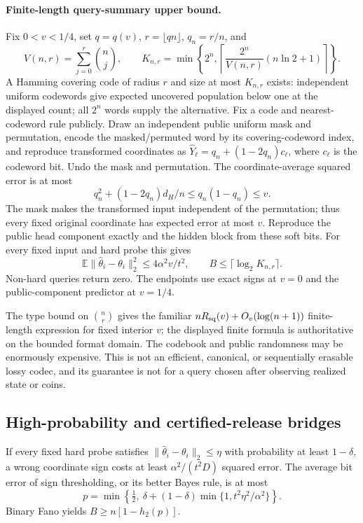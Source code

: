 \paragraph{Finite-length query-summary upper bound.}
Fix $0<v<1/4$, set $q=q(v)$, $r=\lfloor qn\rfloor$, $q_n=r/n$, and
\[
 V(n,r)=\sum_{j=0}^{r}\binom nj,\qquad
 K_{n,r}=\min\left\{2^n,
 \left\lceil\frac{2^n}{V(n,r)}(n\ln2+1)\right\rceil\right\}.
\]
A Hamming covering code of radius $r$ and size at most $K_{n,r}$ exists:
independent uniform codewords give expected uncovered population below
one at the displayed count; all $2^n$ words supply the alternative.
Fix a code and nearest-codeword rule publicly.  Draw an independent public
uniform mask and permutation, encode the masked/permuted word by its
covering-codeword index, and reproduce transformed coordinates as
$\widehat Y_\ell=q_n+(1-2q_n)c_\ell$, where $c_\ell$ is the codeword bit.
Undo the mask and permutation.
The coordinate-average squared error is at most
\[
 q_n^2+(1-2q_n)d_H/n\le q_n(1-q_n)\le v.
\]
The mask makes the transformed input independent of the permutation; thus
every fixed original coordinate has expected error at most $v$.  Reproduce
the public head component exactly and the hidden block from these soft
bits.  For every fixed input and hard probe this gives
\[
 \mathbb E\|\widehat\theta_i-\theta_i\|_2^2
 \le4\alpha^2v/t^2,\qquad B\le\lceil\log_2K_{n,r}\rceil.
\]
Non-hard queries return zero.  The endpoints use exact signs at $v=0$ and
the public-component predictor at $v=1/4$.

The type bound on $\binom nr$ gives the familiar
$nR_{\rm sq}(v)+O_v(\log(n+1))$ finite-length expression for fixed interior
$v$; the displayed finite formula is authoritative on the bounded format
domain.  The codebook and public randomness may be enormously expensive.
This is not an efficient, canonical, or sequentially erasable lossy codec,
and its guarantee is not for a query chosen after observing realized
state or coins.

\subsection{High-probability and certified-release bridges}
If every fixed hard probe satisfies $\|\widehat\theta_i-\theta_i\|_2\le\eta$
with probability at least $1-\delta$, a wrong coordinate sign costs at
least $\alpha^2/(t^2D)$ squared error.  The average bit error of sign
thresholding, or its better Bayes rule, is at most
\[
 p=\min\left\{\tfrac12,\ \delta+(1-\delta)
                              \min\{1,t^2\eta^2/\alpha^2\}\right\}.
\]
Binary Fano yields $B\ge n[1-h_2(p)]$.

